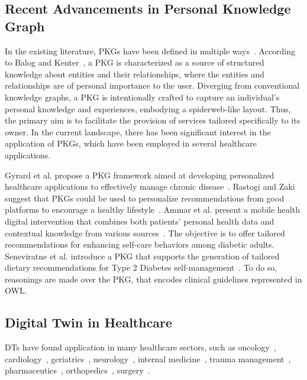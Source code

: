 \subsection{Recent Advancements in Personal Knowledge Graph}
In the existing literature, PKGs have been defined in multiple ways~\cite{skjaeveland_ecosystem_2023}. According to Balog and Kenter~\cite{balog_personal_2019}, a PKG is characterized as a source of structured knowledge about entities and their relationships, where the entities and relationships are of personal importance to the user. Diverging from conventional knowledge graphs, a PKG is intentionally crafted to capture an individual’s personal knowledge and experiences, embodying a spiderweb-like layout. Thus, the primary aim is to facilitate the provision of services tailored specifically to its owner. In the current landscape, there has been significant interest in the application of PKGs, which have been employed in several healthcare applications. 

Gyrard et al. propose a PKG framework aimed at developing personalized healthcare applications to effectively manage chronic disease~\cite{gyrard_personalized_2018}.
Rastogi and Zaki suggest that PKGs could be used to personalize recommendations from good platforms to encourage a healthy lifestyle~\cite{rastogi_personal_2020}.  
Ammar et al. present a mobile health digital intervention that combines both patients’ personal health data and contextual knowledge from various sources~\cite{ammar_using_2021}. The objective is to offer tailored recommendations for enhancing self-care behaviors among diabetic adults. Seneviratne et al. introduce a PKG that supports the generation of tailored dietary recommendations for Type 2 Diabetes self-management~\cite{seneviratne_personal_2021}. To do so, reasonings are made over the PKG, that encodes clinical guidelines represented in OWL. 

\subsection{Digital Twin in Healthcare}
DTs have found application in many healthcare sectors, such as oncology~\cite{sager_digital_2023}, cardiology~\cite{corral-acero_digital_2020}, geriatrics~\cite{liu_novel_2019}, neurology~\cite{voigt_digital_2021}, internal medicine~\cite{subramanian_digital_2020}, trauma management~\cite{croatti_integration_2020}, pharmaceutics~\cite{Björnsson2019}, orthopedics~\cite{aubert_development_2021}, surgery~\cite{heartflow_case_nodate}. 

